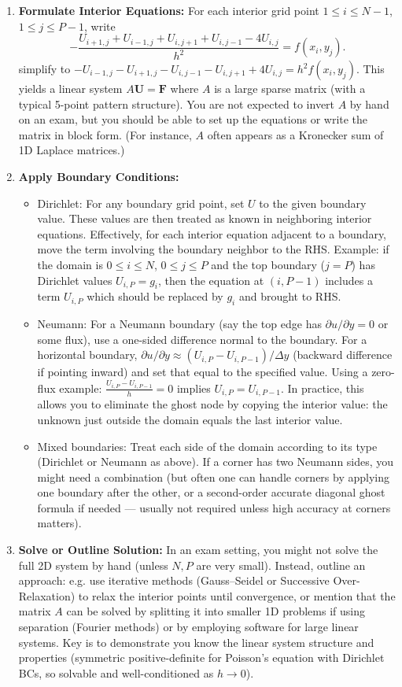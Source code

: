 \documentclass[a4paper,11pt]{article}
\begin{document}
\begin{enumerate}
    \item \textbf{Formulate Interior Equations:} For each interior grid point $1\le i\le N-1$, $1\le j\le P-1$, write
          $$
              - \frac{U_{i+1,j}+U_{i-1,j}+U_{i,j+1}+U_{i,j-1}-4U_{i,j}}{h^2} = f(x_i,y_j).
          $$
          simplify to $-U_{i-1,j} - U_{i+1,j} - U_{i,j-1} - U_{i,j+1} + 4U_{i,j} = h^2 f(x_i,y_j)$.
          This yields a linear system $A\mathbf{U}=\mathbf{F}$ where $A$ is a large sparse matrix (with a typical 5-point pattern structure). You are not expected to invert $A$ by hand on an exam, but you should be able to set up the equations or write the matrix in block form. (For instance, $A$ often appears as a Kronecker sum of 1D Laplace matrices.)
    \item \textbf{Apply Boundary Conditions:}
          \begin{itemize}
              \item Dirichlet: For any boundary grid point, set $U$ to the given boundary value. These values are then treated as known in neighboring interior equations. Effectively, for each interior equation adjacent to a boundary, move the term involving the boundary neighbor to the RHS. Example: if the domain is $0\le i\le N$, $0\le j\le P$ and the top boundary ($j=P$) has Dirichlet values $U_{i,P}=g_i$, then the equation at $(i,P-1)$ includes a term $U_{i,P}$ which should be replaced by $g_i$ and brought to RHS.
              \item Neumann: For a Neumann boundary (say the top edge has $\partial u/\partial y = 0$ or some flux), use a one-sided difference normal to the boundary. For a horizontal boundary, $\partial u/\partial y \approx (U_{i,P} - U_{i,P-1})/\Delta y$ (backward difference if pointing inward) and set that equal to the specified value. Using a zero-flux example: $\frac{U_{i,P} - U_{i,P-1}}{h} = 0$ implies $U_{i,P} = U_{i,P-1}$. In practice, this allows you to eliminate the ghost node by copying the interior value: the unknown just outside the domain equals the last interior value.
              \item Mixed boundaries: Treat each side of the domain according to its type (Dirichlet or Neumann as above). If a corner has two Neumann sides, you might need a combination (but often one can handle corners by applying one boundary after the other, or a second-order accurate diagonal ghost formula if needed — usually not required unless high accuracy at corners matters).
          \end{itemize}
    \item \textbf{Solve or Outline Solution:} In an exam setting, you might not solve the full 2D system by hand (unless $N,P$ are very small). Instead, outline an approach: e.g. use iterative methods (Gauss--Seidel or Successive Over-Relaxation) to relax the interior points until convergence, or mention that the matrix $A$ can be solved by splitting it into smaller 1D problems if using separation (Fourier methods) or by employing software for large linear systems. Key is to demonstrate you know the linear system structure and properties (symmetric positive-definite for Poisson’s equation with Dirichlet BCs, so solvable and well-conditioned as $h\to0$).

\end{enumerate}
\end{document}
